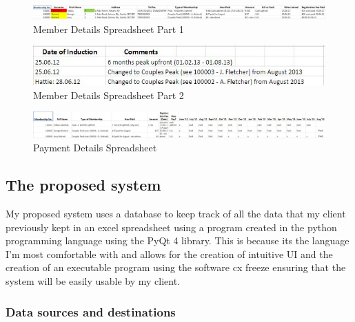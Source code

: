 \begin{figure}[H]
    \includegraphics[width=\textwidth]{MemberSpreadsheet1.JPG}
    \caption{Member Details Spreadsheet Part 1} \label{fig:Member Details Spreadsheet Part 1}
\end{figure}

\begin{figure}[H]
    \includegraphics[width=\textwidth]{MemberSpreadsheet2.JPG}
    \caption{Member Details Spreadsheet Part 2} \label{fig:Member Details Spreadsheet Part 2}
\end{figure}

\begin{figure}[H]
    \includegraphics[width=\textwidth]{PaymentSpreadsheet.JPG}
    \caption{Payment Details Spreadsheet } \label{fig:Payment Details Spreadsheet }
\end{figure}

\subsection{The proposed system}

My proposed system uses a database to keep track of all the data that my client previously kept in an excel spreadsheet using a program created in the python programming language using the PyQt 4 library. This is because its the language I'm most comfortable with and allows for the creation of intuitive UI and the creation of an executable program using the software cx freeze ensuring that the system will be easily usable by my client.

\subsubsection{Data sources and destinations}

